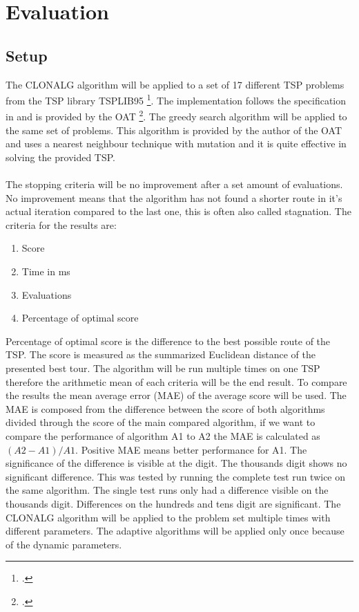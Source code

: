\chapter{Evaluation}
\label{chap:eva}
\section{Setup}
The CLONALG algorithm will be applied to a set of 17 different TSP problems from the TSP library TSPLIB95 \footcite[https://www.iwr.uni-heidelberg.de/groups/comopt/software/TSPLIB95/]{tsplib}. The implementation follows the specification in \cite{DEC02} and is provided by the OAT \footcite[http://optalgtoolkit.sourceforge.net/]{oat}. The greedy search algorithm will be applied to the same set of problems. This algorithm is provided by the author of the OAT and uses a nearest neighbour technique with mutation and it is quite effective in solving the provided TSP.\\\\ 
The stopping criteria will be no improvement after a set amount of evaluations. No improvement means that the algorithm has not found a shorter route in it's actual iteration compared to the last one, this is often also called stagnation. 
The criteria for the results are:
\begin{enumerate}
	\item 	Score
	\item 	Time in ms
	\item 	Evaluations	
	\item  	Percentage of optimal score
\end{enumerate}
Percentage of optimal score is the difference to the best possible route of the TSP. The score is measured as the summarized Euclidean distance of the presented best tour. The algorithm will be run multiple times on one TSP therefore the arithmetic mean of each criteria will be the end result. To compare the results the mean average error (MAE) of the average score will be used. The MAE is composed from the difference between the score of both algorithms divided through the score of the main compared algorithm, if we want to compare the performance of algorithm A1 to A2 the MAE is calculated as $(A2-A1)/A1$. Positive MAE means better performance for A1. The significance of the difference is visible at the digit. The thousands digit shows no significant difference. This was tested by running the complete test run twice on the same algorithm. The single test runs only had a difference visible on the thousands digit. Differences on the hundreds and tens digit are significant. The CLONALG algorithm will be applied to the problem set multiple times with different parameters. The adaptive algorithms will be applied only once because of the dynamic parameters.
